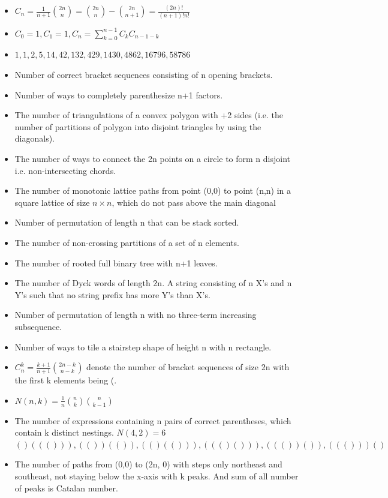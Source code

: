 \begin{itemize}
{          \vspace{-1em}
          \footnotesize
          \begin{itemize} \itemsep0em
              \item \textbf{Bad Path:} Touches $y=x+1$.
              \item \textbf{Reflection:} Flip path after first touch.
              \item \textbf{Mapping:} Bad path to $(n,n)$ $\iff$ Path to $(n-1, n+1)$.
          \end{itemize}}
    \item $C_n = \frac{1}{n+1}\binom{2n}{n} = \binom{2n}{n}-\binom{2n}{n+1} = \frac{(2n)!}{(n+1)!n!}$
    \item $C_0 = 1, C_1 = 1, C_n = \sum_{k=0}^{n-1}C_kC_{n-1-k}$
    \item $1, 1, 2, 5, 14, 42, 132, 429, 1430, 4862, 16796, 58786$
    \item Number of correct bracket sequences consisting of n opening brackets.
    \item Number of ways to completely parenthesize n+1 factors.
    \item The number of triangulations of a convex polygon with +2 sides (i.e. the number
          of partitions of polygon into disjoint triangles by using the diagonals).
    \item The number of ways to connect the 2n points on a circle to form n disjoint i.e.
          non-intersecting chords.
    \item The number of monotonic lattice paths from point (0,0) to point (n,n) in a
          square lattice of size $n\times n$, which do not pass above the main diagonal
    \item Number of permutation of length n that can be stack sorted.
    \item The number of non-crossing partitions of a set of n elements.
    \item The number of rooted full binary tree with n+1 leaves.
    \item The number of Dyck words of length 2n. A string consisting of n X's and n Y's
          such that no string prefix has more Y's than X's.
    \item Number of permutation of length n with no three-term increasing subsequence.
    \item Number of ways to tile a stairstep shape of height n with n rectangle.
    \item $C^k_n = \frac{k+1}{n+1}\binom{2n-k}{n-k}$ denote the number of bracket sequences of size 2n with the first k elements being (.
    \item $N(n,k) = \frac{1}{n}\binom{n}{k}\binom{n}{k-1}$
    \item The number of expressions containing n pairs of correct parentheses, which
          contain k distinct nestings. $N(4,2) = 6$ \\ $()((())), (())(()), (()(())),
              ((()())), ((())()), ((()))()$
    \item The number of paths from (0,0) to (2n, 0) with steps only northeast and
          southeast, not staying below the x-axis with k peaks. And sum of all number of
          peaks is Catalan number.
\end{itemize}
